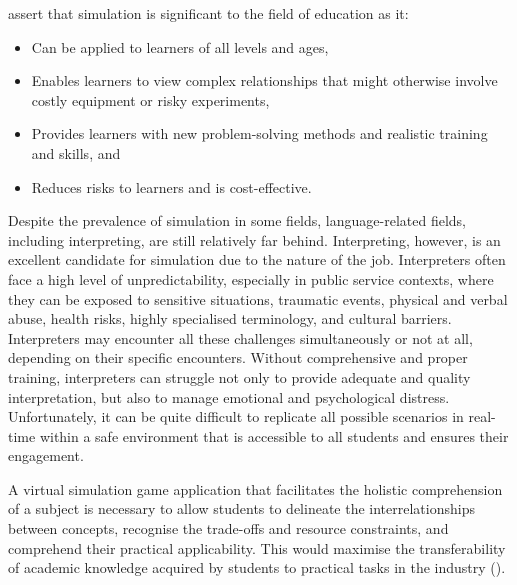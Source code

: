 \documentclass[output=paper]{langscibook}
\begin{document}
\citet[273]{kincaid2003simulation} assert that simulation is significant to the field of education as it:

\begin{itemize}
\item Can be applied to learners of all levels and ages,
\item Enables learners to view complex relationships that might otherwise involve costly equipment or risky experiments,
\item Provides learners with new problem-solving methods and realistic training and skills, and
\item Reduces risks to learners and is cost-effective.
\end{itemize}

Despite the prevalence of simulation in some fields, language-related fields, including interpreting, are still relatively far behind. Interpreting, however, is an excellent candidate for simulation due to the nature of the job. Interpreters often face a high level of unpredictability, especially in public service contexts, where they can be exposed to sensitive situations, traumatic events, physical and verbal abuse, health risks, highly specialised terminology, and cultural barriers. Interpreters may encounter all these challenges simultaneously or not at all, depending on their specific encounters. Without comprehensive and proper training, interpreters can struggle not only to provide adequate and quality interpretation, but also to manage emotional and psychological distress. Unfortunately, it can be quite difficult to replicate all possible scenarios in real-time within a safe environment that is accessible to all students and ensures their engagement.

A virtual simulation game application that facilitates the holistic comprehension of a subject is necessary to allow students to delineate the interrelationships between concepts, recognise the trade-offs and resource constraints, and comprehend their practical applicability. This would maximise the transferability of academic knowledge acquired by students to practical tasks in the industry (\citealt{loureiro-koechlin2012online}).
\end{document}

